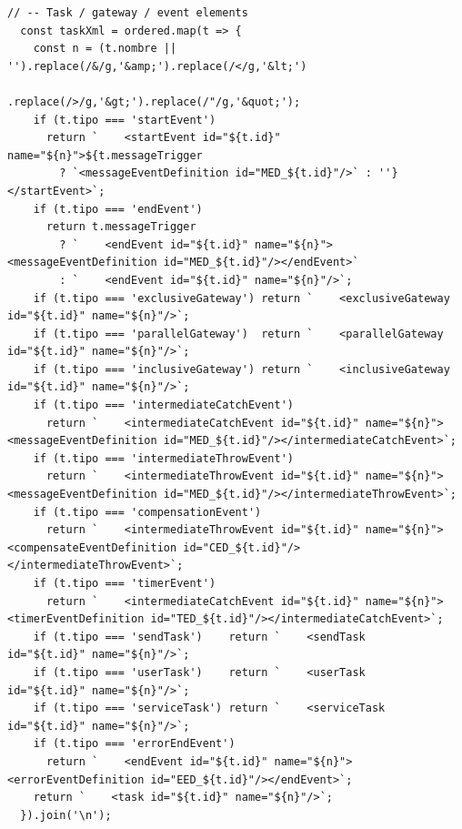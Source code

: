\begin{lstlisting}[style=promptbox]
  // -- Task / gateway / event elements
  const taskXml = ordered.map(t => {
    const n = (t.nombre || '').replace(/&/g,'&amp;').replace(/</g,'&lt;')
                              .replace(/>/g,'&gt;').replace(/"/g,'&quot;');
    if (t.tipo === 'startEvent')
      return `    <startEvent id="${t.id}" name="${n}">${t.messageTrigger
        ? `<messageEventDefinition id="MED_${t.id}"/>` : ''}</startEvent>`;
    if (t.tipo === 'endEvent')
      return t.messageTrigger
        ? `    <endEvent id="${t.id}" name="${n}"><messageEventDefinition id="MED_${t.id}"/></endEvent>`
        : `    <endEvent id="${t.id}" name="${n}"/>`;
    if (t.tipo === 'exclusiveGateway') return `    <exclusiveGateway id="${t.id}" name="${n}"/>`;
    if (t.tipo === 'parallelGateway')  return `    <parallelGateway  id="${t.id}" name="${n}"/>`;
    if (t.tipo === 'inclusiveGateway') return `    <inclusiveGateway id="${t.id}" name="${n}"/>`;
    if (t.tipo === 'intermediateCatchEvent')
      return `    <intermediateCatchEvent id="${t.id}" name="${n}"><messageEventDefinition id="MED_${t.id}"/></intermediateCatchEvent>`;
    if (t.tipo === 'intermediateThrowEvent')
      return `    <intermediateThrowEvent id="${t.id}" name="${n}"><messageEventDefinition id="MED_${t.id}"/></intermediateThrowEvent>`;
    if (t.tipo === 'compensationEvent')
      return `    <intermediateThrowEvent id="${t.id}" name="${n}"><compensateEventDefinition id="CED_${t.id}"/></intermediateThrowEvent>`;
    if (t.tipo === 'timerEvent')
      return `    <intermediateCatchEvent id="${t.id}" name="${n}"><timerEventDefinition id="TED_${t.id}"/></intermediateCatchEvent>`;
    if (t.tipo === 'sendTask')    return `    <sendTask    id="${t.id}" name="${n}"/>`;
    if (t.tipo === 'userTask')    return `    <userTask    id="${t.id}" name="${n}"/>`;
    if (t.tipo === 'serviceTask') return `    <serviceTask id="${t.id}" name="${n}"/>`;
    if (t.tipo === 'errorEndEvent')
      return `    <endEvent id="${t.id}" name="${n}"><errorEventDefinition id="EED_${t.id}"/></endEvent>`;
    return `    <task id="${t.id}" name="${n}"/>`;
  }).join('\n');


\end{lstlisting}
